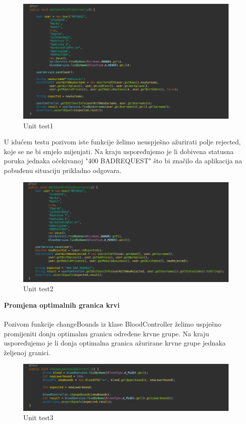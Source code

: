 \begin{figure}[H]
	\centering
	\includegraphics[width=\textwidth, scale=0.5]{slike/unit1}
	\caption{Unit test1}
\end{figure}
{U idućem testu pozivom iste funkcije želimo neuspješno ažurirati polje rejected, koje se ne bi smjelo mijenjati. Na kraju uspoređujemo je li dobivena statusna poruka jednaka očekivanoj "400 BADREQUEST" što bi značilo da aplikacija na pobuđenu situaciju prikladno odgovara.}
\begin{figure}[H]
	\centering
	\includegraphics[width=\textwidth, scale=0.5]{slike/unit2}
	\caption{Unit test2}
\end{figure}
\textbf{Promjena optimalnih granica krvi}
\\\\
Pozivom funkcije changeBounds iz klase BloodController želimo uspješno promijeniti donju optimalnu granicu određene krvne grupe. Na kraju uspoređujemo je li donja optimalna granica ažurirane krvne grupe jednaka željenoj granici.
\begin{figure}[H]
	\centering
	\includegraphics[width=\textwidth, scale=0.5]{slike/unit3}
	\caption{Unit test3}
\end{figure}
